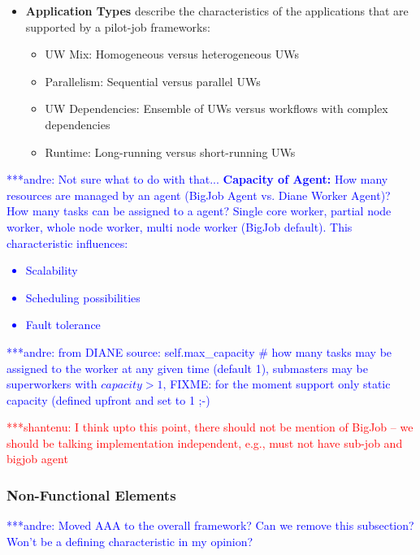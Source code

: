 \documentclass[conference,final]{IEEEtran}
\newcommand{\jhanote}[1]{ {\textcolor{red} { ***shantenu: #1 }}}
\newcommand{\alnote}[1]{ {\textcolor{blue} { ***andre: #1 }}}
\newcommand{\alnote}[1]{}
\newcommand{\jhanote}[1]{}
\begin{document}
\begin{itemize}
\item \textbf{Application Types} describe the characteristics of the 
applications that are supported by a pilot-job frameworks:
\begin{itemize}
    \item UW Mix: Homogeneous versus heterogeneous UWs
    \item Parallelism: Sequential versus parallel UWs
    \item UW Dependencies: Ensemble of UWs versus workflows with complex 
    dependencies
    \item Runtime: Long-running versus short-running UWs
\end{itemize}
\end{itemize}

\alnote{Not sure what to do with that...
\textbf{Capacity of Agent:} How many resources are managed by an agent (BigJob Agent vs. Diane Worker Agent)? How many tasks can be assigned to a agent? Single core worker, partial node worker, whole node worker, multi node worker (BigJob
default). This characteristic influences: 
    \begin{itemize}
        \item Scalability
        \item Scheduling possibilities
        \item Fault tolerance
    \end{itemize}
    \alnote{from DIANE source: self.max\_capacity \# how many tasks may be 
    assigned to the worker at any given time (default 1), submasters may be 
    superworkers with $capacity>1$, FIXME: for the moment support only static 
    capacity (defined upfront and set to 1 ;-)}    
}



\jhanote{I think upto this point, there should not be mention of
  BigJob -- we should be talking implementation independent, e.g., must
  not have sub-job and bigjob agent}



\subsubsection{Non-Functional Elements}

\alnote{Moved AAA to the overall framework? Can we remove this subsection? Won't be a defining characteristic in my opinion?}
\end{document}
